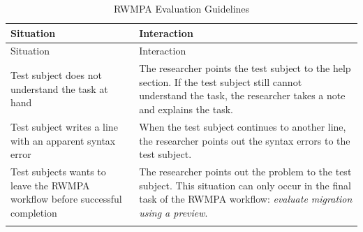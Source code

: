 \hypertarget{tbl:rwmpa.guidelines}{}
\begin{longtable}[]{@{}ll@{}}
\caption{\label{tbl:rwmpa.guidelines}RWMPA Evaluation Guidelines}\tabularnewline
\toprule
\begin{minipage}[b]{0.47\columnwidth}\raggedright
Situation\strut
\end{minipage} & \begin{minipage}[b]{0.47\columnwidth}\raggedright
Interaction\strut
\end{minipage}\tabularnewline
\midrule
\endfirsthead
\toprule
\begin{minipage}[b]{0.47\columnwidth}\raggedright
Situation\strut
\end{minipage} & \begin{minipage}[b]{0.47\columnwidth}\raggedright
Interaction\strut
\end{minipage}\tabularnewline
\midrule
\endhead
\begin{minipage}[t]{0.47\columnwidth}\raggedright
Test subject does not understand the task at hand\strut
\end{minipage} & \begin{minipage}[t]{0.47\columnwidth}\raggedright
The researcher points the test subject to the help section.
If the test subject still cannot understand the task, the researcher takes a note and explains the task.\strut
\end{minipage}\tabularnewline
\begin{minipage}[t]{0.47\columnwidth}\raggedright
Test subject writes a line with an apparent syntax error\strut
\end{minipage} & \begin{minipage}[t]{0.47\columnwidth}\raggedright
When the test subject continues to another line, the researcher points out the syntax errors to the test subject.\strut
\end{minipage}\tabularnewline
\begin{minipage}[t]{0.47\columnwidth}\raggedright
Test subjects wants to leave the RWMPA workflow before successful completion\strut
\end{minipage} & \begin{minipage}[t]{0.47\columnwidth}\raggedright
The researcher points out the problem to the test subject.
This situation can only occur in the final task of the RWMPA workflow: \emph{evaluate migration using a preview}.\strut
\end{minipage}\tabularnewline
\begin{minipage}[t]{0.47\columnwidth}\raggedright

\end{minipage}
\end{longtable}
